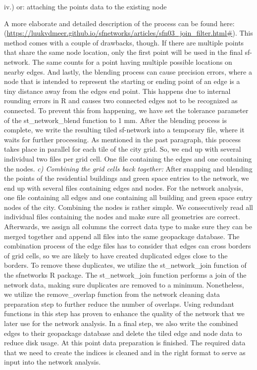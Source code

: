 \documentclass[10pt]{article}
\begin{document}
iv.) or: attaching the points data to the existing node

A more elaborate and detailed description of the process can be found here: (\url{https://luukvdmeer.github.io/sfnetworks/articles/sfn03_join_filter.html#}). This method comes with a couple of drawbacks, though. If there are multiple points that share the same node location, only the first point will be used in the final sf-network. The same counts for a point having multiple possible locations on nearby edges. And lastly, the blending process can cause precision errors, where a node that is intended to represent the starting or ending point of an edge is a tiny distance away from the edges end point. This happens due to internal rounding errors in R and causes two connected edges not to be recognized as connected. To prevent this from happening, we have set the tolerance parameter of the st\_network\_blend function to 1 mm. After the blending process is complete, we write the resulting tiled sf-network into a temporary file, where it waits for further processing. As mentioned in the past paragraph, this process takes place in parallel for each tile of the city grid. So, we end up with several individual two files per grid cell. One file containing the edges and one containing the nodes. 
\textit{c) Combining the grid cells back together:} After snapping and blending the points of the residential buildings and green space entries to the network, we end up with several files containing edges and nodes. For the network analysis, one file containing all edges and one containing all building and green space entry nodes of the city. Combining the nodes is rather simple. We consecutively read all individual files containing the nodes and make sure all geometries are correct. Afterwards, we assign all columns the correct data type to make sure they can be merged together and append all files into the same geopackage database. The combination process of the edge files has to consider that edges can cross borders of grid cells, so we are likely to have created duplicated edges close to the borders. To remove these duplicates, we utilize the st\_network\_join function of the sfnetworks R package. The st\_network\_join function performs a join of the network data, making sure duplicates are removed to a minimum. Nonetheless, we utilize the remove\_overlap function from the network cleaning data preparation step to further reduce the number of overlaps. Using redundant functions in this step has proven to enhance the quality of the network that we later use for the network analysis. In a final step, we also write the combined edges to their geopackage database and delete the tiled edge and node data to reduce disk usage.
At this point data preparation is finished. The required data that we need to create the indices is cleaned and in the right format to serve as input into the network analysis.
\end{document}
